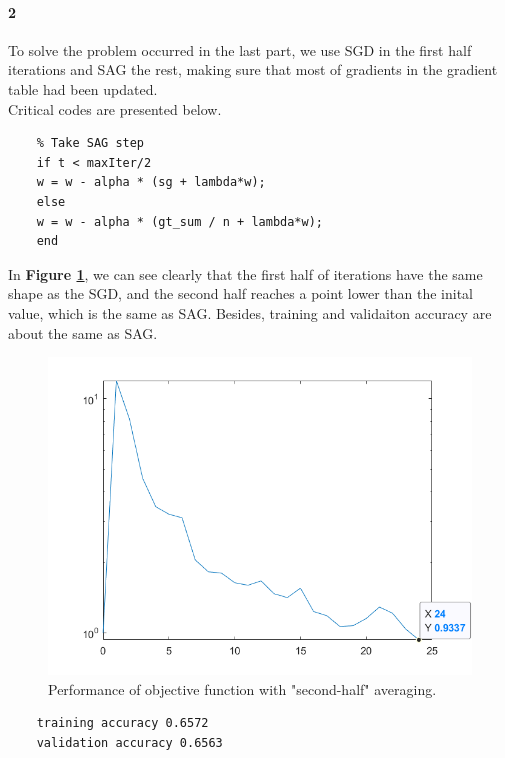 \documentclass{article}
\begin{document}
\paragraph{2}

To solve the problem occurred in the last part, we use SGD in the first half iterations and SAG the rest, making sure that most of gradients in the gradient table had been updated.\\

Critical codes are presented below.

\begin{lstlisting}
	% Take SAG step
	if t < maxIter/2
	w = w - alpha * (sg + lambda*w);
	else
	w = w - alpha * (gt_sum / n + lambda*w);
	end
\end{lstlisting}

In \textbf{Figure \ref{fig19}}, we can see clearly that the first half of iterations have the same shape as the SGD, and the second half reaches a point lower than the inital value, which is the same as SAG. Besides, training and validaiton accuracy are about the same as SAG.

\begin{figure}[H]
	\centering
	\includegraphics[scale=0.5]{figure19}
	\caption{Performance of objective function with "second-half" averaging.}
	\label{fig19}
\end{figure}

\begin{commandline}
	\begin{verbatim}
	training accuracy 0.6572
	validation accuracy 0.6563
	\end{verbatim}
\end{commandline}
\end{document}
